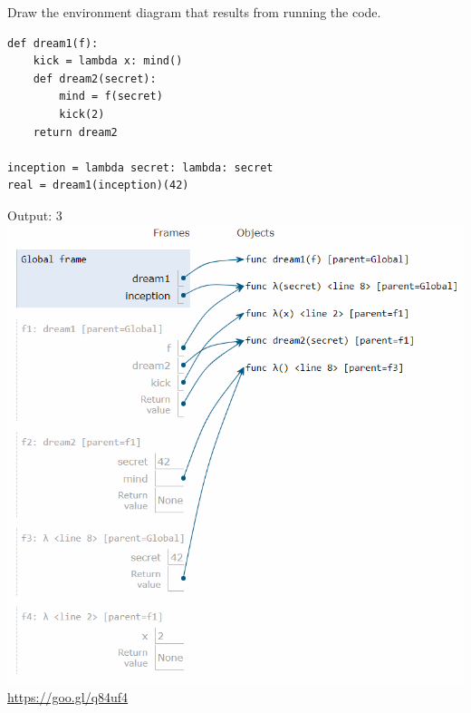 \begin{blocksection}
\question Draw the environment diagram that results from running the code.

\begin{lstlisting}
def dream1(f):
    kick = lambda x: mind()
    def dream2(secret):
        mind = f(secret)
        kick(2)
    return dream2

inception = lambda secret: lambda: secret
real = dream1(inception)(42)
\end{lstlisting}

\begin{solution}[2in]
Output: 3 \newline
\includegraphics[scale=0.5]{inception.png}
\newline
\url{https://goo.gl/q84uf4}
\end{solution}
\end{blocksection}
